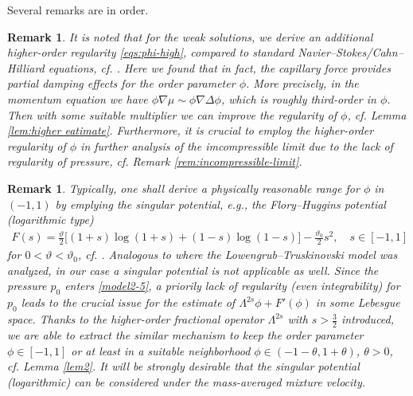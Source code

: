 \documentclass[reqno,a4paper,11pt]{amsart}
\theoremstyle{plain}
\newtheorem{remark}[theorem]{Remark}
\numberwithin{equation}{section}
\begin{document}
Several remarks are in order.
\begin{remark}
	{It is noted that for the weak solutions, we derive an additional higher-order regularity \eqref{eqs:phi-high}, compared to standard Navier--Stokes/Cahn--Hilliard equations, cf. \cite{AH,ADG}. Here we found that in fact, the capillary force provides partial damping effects for the order parameter $\phi$. More precisely, in the momentum equation we have $\phi \nabla \mu \sim \phi \nabla \Delta \phi$, which is roughly third-order in $\phi$. Then with some suitable multiplier we can improve the regularity of $\phi$, cf. Lemma \ref{lem:higher eatimate}.} Furthermore, it is crucial to employ the higher-order regularity of $\phi$ in further analysis of the imcompressible limit due to the lack of regularity of pressure, cf. Remark \ref{rem:incompressible-limit}.
\end{remark}
\begin{remark}
	Typically, one shall derive a physically reasonable range for $ \phi $ in $ (-1,1) $ by emplying the singular potential, e.g., the Flory--Huggins potential (logarithmic type)
	\begin{align*}
		F(s) =
		\frac{\vartheta}{2}\Big[(1 + s)\log(1 + s) + (1 - s)\log(1 - s)\Big]
		- \frac{\vartheta_0}{2} s^2, \quad s \in [-1,1]
	\end{align*}
	for $ 0 < \vartheta < \vartheta_0 $, cf. \cite{AbelsARMA2009,ADG,AGG2024,Giorgini2021}.
	Analogous to \cite{AH} where the Lowengrub--Truskinovski model \cite{LT1998} was analyzed, in our case a singular potential is not applicable as well. Since the pressure $ p_0 $ enters \eqref{model2-5}, a priorily lack of regularity (even integrability) for $ p_0 $ leads to the crucial issue for the estimate of $ \Lambda^{2s} \phi + F'(\phi) $ in some Lebesgue space. Thanks to the higher-order fractional operator $ \Lambda^{2s} $ with $s > \frac{3}{2}$ introduced, we are able to extract the similar mechanism to keep the order parameter $ \phi \in [-1,1] $ or at least in a suitable neighborhood $ \phi \in (-1-\theta,1+\theta) $, $ \theta > 0 $, cf. Lemma \ref{lem2}. {It will be strongly desirable that the singular potential (logarithmic) can be considered under the mass-averaged mixture velocity.}
\end{remark}
\end{document}
